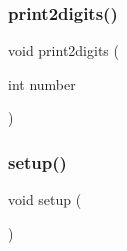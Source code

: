 \subsubsection{\texorpdfstring{print2digits()}{print2digits()}}
{\footnotesize\ttfamily void print2digits (\begin{DoxyParamCaption}\item[{int}]{number }\end{DoxyParamCaption})}

\mbox{\label{_read_test_8ino_a4fc01d736fe50cf5b977f755b675f11d}} 
\subsubsection{\texorpdfstring{setup()}{setup()}}
{\footnotesize\ttfamily void setup (\begin{DoxyParamCaption}{ }\end{DoxyParamCaption})}

